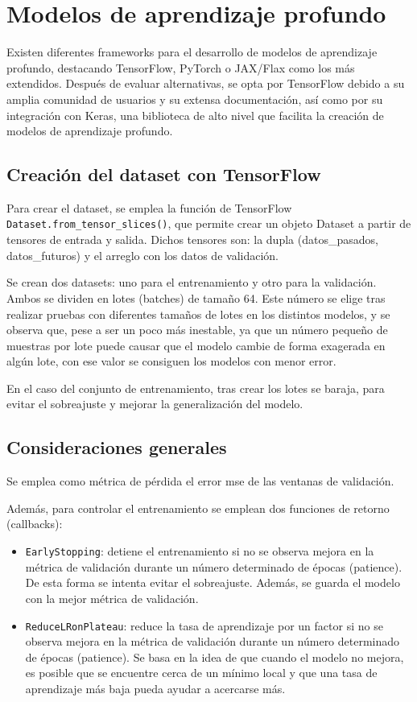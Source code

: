 \section{Modelos de aprendizaje profundo}
Existen diferentes frameworks para el desarrollo de modelos de aprendizaje profundo, destacando TensorFlow, PyTorch o JAX/Flax como los más extendidos.
Después de evaluar alternativas, se opta por TensorFlow debido a su amplia comunidad de usuarios y su extensa documentación, así como por su integración con Keras, 
una biblioteca de alto nivel que facilita la creación de modelos de aprendizaje profundo.

\subsection{Creación del dataset con TensorFlow}
Para crear el dataset, se emplea la función de TensorFlow \texttt{Dataset.from\_tensor\_slices()}, que permite crear un objeto Dataset 
a partir de tensores de entrada y salida. Dichos tensores son: la dupla (datos\_pasados, datos\_futuros) y el arreglo con los datos de validación.

Se crean dos datasets: uno para el entrenamiento y otro para la validación. Ambos se dividen en lotes (batches) de tamaño 64. Este número se elige tras realizar 
pruebas con diferentes tamaños de lotes en los distintos modelos, y se observa que, pese a ser un poco más inestable, ya que un número pequeño de muestras por lote
puede causar que el modelo cambie de forma exagerada en algún lote, con ese valor se consiguen los modelos con menor error. 

En el caso del conjunto de entrenamiento, tras crear los lotes se baraja, para evitar el sobreajuste y mejorar la generalización del modelo.

\subsection{Consideraciones generales}
Se emplea como métrica de pérdida el error mse de las ventanas de validación.

Además, para controlar el entrenamiento se emplean dos funciones de retorno (callbacks): 
\begin{itemize}
\item \texttt{EarlyStopping}: detiene el entrenamiento si no se observa mejora en la métrica de validación durante un número determinado de épocas (patience). 
De esta forma se intenta evitar el sobreajuste. Además, se guarda el modelo con la mejor métrica de validación.
\item \texttt{ReduceLRonPlateau}: reduce la tasa de aprendizaje por un factor si no se observa mejora en la métrica de validación durante un número determinado de épocas (patience).
Se basa en la idea de que cuando el modelo no mejora, es posible que se encuentre cerca de un mínimo local y que una tasa de aprendizaje más baja pueda ayudar a acercarse más.
\end{itemize}


